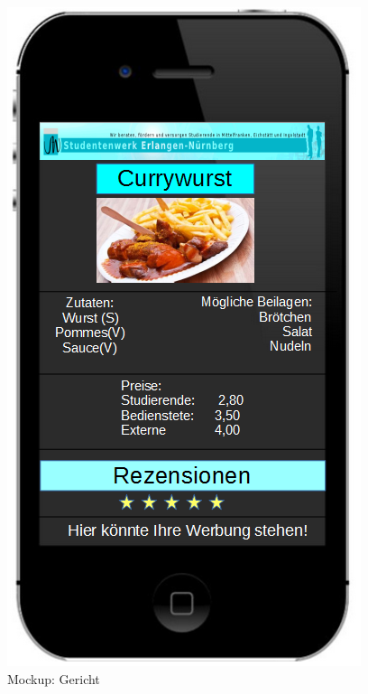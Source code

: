 \begin{figure}[h]
    \centering
    \includegraphics[scale=0.4]{./inc/aufgabe05/MockupGericht}
    \caption{Mockup: Gericht}
\end{figure}










        

    

